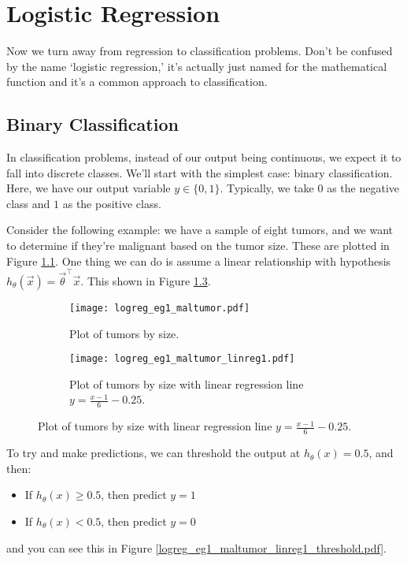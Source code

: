 \chapter{Logistic Regression}

Now we turn away from regression to classification problems. Don't be confused by the name `logistic regression,' it's actually just named for the mathematical function and it's a common approach to classification.

\section{Binary Classification}
In classification problems, instead of our output being continuous, we expect it to fall into discrete classes. We'll start with the simplest case: binary classification. Here, we have our output variable $y \in \{0, 1\}$. Typically, we take $0$ as the negative class and $1$ as the positive class. 

Consider the following example: we have a sample of eight tumors, and we want to determine if they're malignant based on the tumor size. These are plotted in Figure \ref{logreg-eg-maltumor-noregline}. One thing we can do is assume a linear relationship with hypothesis $h_\theta\left( \vec{x} \right) = \vec{\theta}^\intercal \vec{x}$. This shown in Figure \ref{logreg_eg1_maltumor_linreg1}.

\begin{figure}[h]
	\centering
	\begin{subfigure}[t]{0.45\textwidth}
   		\centering
    		\graphicspath{{./Figures/}}
  		\texttt{[image: logreg\_eg1\_maltumor.pdf]} 
   		\caption[]{Plot of tumors by size. }
   		\label{logreg-eg-maltumor-noregline}
	\end{subfigure}
	\begin{subfigure}[t]{0.45\textwidth}
   		\centering
    		\graphicspath{{./Figures/}}
   		\texttt{[image: logreg\_eg1\_maltumor\_linreg1.pdf]} 
   		\caption[]{Plot of tumors by size with linear regression line $y =  \frac{x-1}{6} - 0.25$.}
   		\label{logreg_eg1_maltumor_linreg1}
	\end{subfigure}
\end{figure}

To try and make predictions, we can threshold the output at $h_\theta\left( x \right) = 0.5$, and then:
\begin{itemize}
\item If $h_\theta\left(x\right) \geq 0.5$, then predict $y = 1$
\item If $h_\theta\left( x \right) < 0.5$, then predict $y = 0$
\end{itemize}
and you can see this in Figure \ref{logreg_eg1_maltumor_linreg1_threshold.pdf}.

